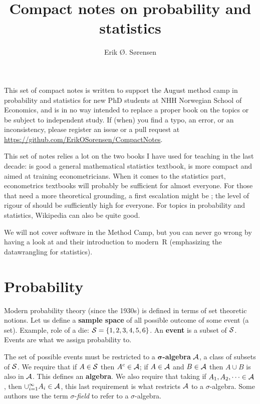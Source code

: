 \documentclass[twoside]{article}
\title{Compact notes on probability and statistics}
\author{Erik Ø. Sørensen}
\begin{document}
\maketitle
\sloppy
\frenchspacing



\tableofcontents
\thispagestyle{empty}
\newpage
\noindent This set of compact notes is written to support the August method camp
in probability and statistics for new PhD students at NHH Norwegian School of
Economics, and is in no way intended to replace a proper book on the topics or
be subject to independent study. If (when) you find a typo, an error, or an inconsistency,
please register an issue or a pull request at \url{https://github.com/ErikOSorensen/CompactNotes}.

This set of notes relies a lot on the two books
I have used for teaching in the last decade: \citet{Hogg2013} is good a general 
mathematical statistics textbook, 
\citet{Linton2017} is more compact and aimed at training econometricians. When it comes to the statistics part, econometrics textbooks
will probably be sufficient for almost everyone. For those that need a more
theoretical grounding, a first escalation might be \citet{Rosenthal2006}; the
level of rigour of \citet{Billingsley1995} should be sufficiently high for
everyone. For topics in probability and statistics, Wikipedia can also be quite good.

We will not cover software in the Method Camp, but you can never go wrong by
having a look at \citet{Wickham2017} and their introduction to modern~R (emphasizing
the datawrangling for statistics).


\section{Probability}
Modern probability theory (since the 1930s) is defined in terms of set theoretic
notions. 
Let us define a \textbf{sample space} of all possible outcome of some
event (a set). Example, role of a die: $\mathcal{S} =\{1,2,3,4,5,6\}$. 
An \textbf{event} is a subset of $\mathcal{S}$. Events are what we assign probability
to.

The set of possible events must be restricted to a
$\mathbf{\sigma}$\textbf{-algebra} $\mathcal{A}$, a class of subsets of $\mathcal{S}$. We
require that if $A\in\mathcal{S}$ then $A^c\in\mathcal{A}$; if $A\in\mathcal{A}$ and $B\in\mathcal{A}$
then $A\cup B$ is also in $\mathcal{A}$. This defines an \textbf{algebra}. We also
require that taking  if $A_1,A_2,\dots\in \mathcal{A}$, then $\cup_{i=1}^\infty A_i
\in \mathcal{A}$, this last requirement is what restricts $\mathcal{A}$ to a
$\sigma$-algebra. Some authors use the term $\sigma$-\emph{field} to refer to a $\sigma$-algebra.
\end{document}
